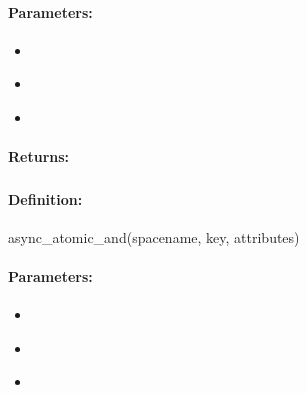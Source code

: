 \paragraph{Parameters:}
\begin{itemize}[noitemsep]
\item {}\\

\item {}\\

\item {}\\

\end{itemize}

\paragraph{Returns:}


\pagebreak
\subsubsection{}
\label{api:ruby:async_atomic_and}


\paragraph{Definition:}
\begin{rubycode}
async_atomic_and(spacename, key, attributes)
\end{rubycode}

\paragraph{Parameters:}
\begin{itemize}[noitemsep]
\item {}\\

\item {}\\

\item {}\\

\end{itemize}

